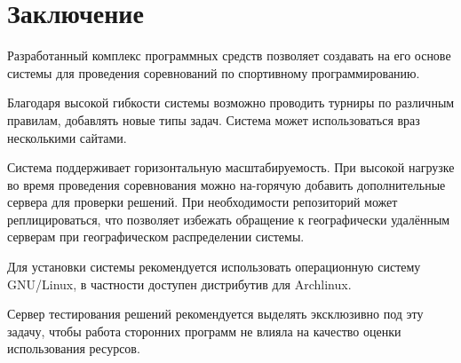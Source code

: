 \chapter{Заключение}
Разработанный комплекс программных средств позволяет создавать на его основе
системы для проведения соревнований по спортивному программированию.

Благодаря высокой гибкости системы возможно проводить турниры по различным правилам,
добавлять новые типы задач. Система может использоваться враз
несколькими сайтами.

Система поддерживает горизонтальную масштабируемость.
При высокой нагрузке во время проведения соревнования можно
на-горячую добавить дополнительные сервера для проверки решений.
При необходимости репозиторий может реплицироваться,
что позволяет избежать обращение к географически удалённым серверам
при географическом распределении системы.

Для установки системы рекомендуется использовать операционную систему
GNU/Linux, в частности доступен дистрибутив для Archlinux.

Сервер тестирования решений рекомендуется выделять
эксклюзивно под эту задачу, чтобы работа сторонних программ
не влияла на качество оценки использования ресурсов.
